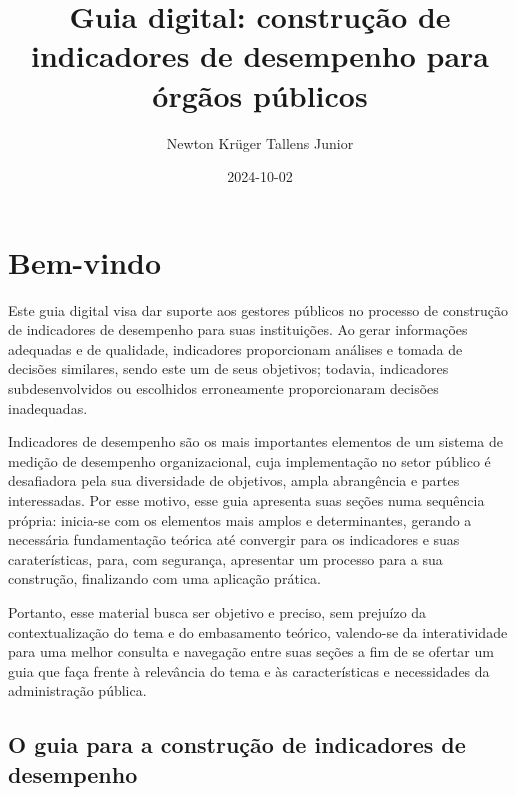 \documentclass[
  letterpaper,
  DIV=11,
  numbers=noendperiod]{scrreprt}
\title{Guia digital: construção de indicadores de desempenho para órgãos
públicos}
\author{Newton Krüger Tallens Junior}
\date{2024-10-02}
\renewcommand*\contentsname{Índice}
\newcommand\contentsname{Índice}
\begin{document}
\maketitle
\ifdefined\Shaded\renewenvironment{Shaded}{\begin{tcolorbox}[borderline west={3pt}{0pt}{shadecolor}, boxrule=0pt, sharp corners, breakable, interior hidden, frame hidden, enhanced]}{\end{tcolorbox}}\fi

\renewcommand*\contentsname{Índice}
{
\hypersetup{linkcolor=}
\setcounter{tocdepth}{2}
\tableofcontents
}

\hypertarget{bem-vindo}{%
\chapter*{Bem-vindo}\label{bem-vindo}}


Este guia digital visa dar suporte aos gestores públicos no processo de
construção de indicadores de desempenho para suas instituições. Ao gerar
informações adequadas e de qualidade, indicadores proporcionam análises
e tomada de decisões similares, sendo este um de seus objetivos;
todavia, indicadores subdesenvolvidos ou escolhidos erroneamente
proporcionaram decisões inadequadas.

Indicadores de desempenho são os mais importantes elementos de um
sistema de medição de desempenho organizacional, cuja implementação no
setor público é desafiadora pela sua diversidade de objetivos, ampla
abrangência e partes interessadas. Por esse motivo, esse guia apresenta
suas seções numa sequência própria: inicia-se com os elementos mais
amplos e determinantes, gerando a necessária fundamentação teórica até
convergir para os indicadores e suas caraterísticas, para, com
segurança, apresentar um processo para a sua construção, finalizando com
uma aplicação prática.

Portanto, esse material busca ser objetivo e preciso, sem prejuízo da
contextualização do tema e do embasamento teórico, valendo-se da
interatividade para uma melhor consulta e navegação entre suas seções a
fim de se ofertar um guia que faça frente à relevância do tema e às
características e necessidades da administração pública.

\hypertarget{o-guia-para-a-construuxe7uxe3o-de-indicadores-de-desempenho}{%
\section*{O guia para a construção de indicadores de
desempenho}\label{o-guia-para-a-construuxe7uxe3o-de-indicadores-de-desempenho}}
\end{document}
